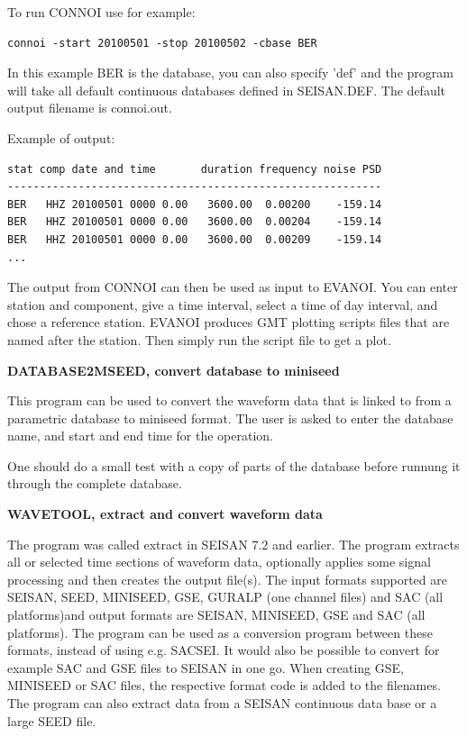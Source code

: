 To run CONNOI use for example:
\begin{verbatim}
connoi -start 20100501 -stop 20100502 -cbase BER
\end{verbatim}

In this example BER is the database, you can also specify 'def' and
the program will take all default continuous databases defined in SEISAN.DEF.
The default output filename is connoi.out. 

Example of output:

\begin{verbatim}
stat comp date and time       duration frequency noise PSD
----------------------------------------------------------
BER   HHZ 20100501 0000 0.00   3600.00  0.00200    -159.14
BER   HHZ 20100501 0000 0.00   3600.00  0.00204    -159.14
BER   HHZ 20100501 0000 0.00   3600.00  0.00209    -159.14
...
\end{verbatim}

The output from CONNOI can then be used as input to EVANOI. You can enter 
station and component, give a time interval, select a time of day interval,
and chose a reference station. EVANOI produces GMT plotting scripts files
that are named after the station. Then simply run the script file to 
get a plot.

\textbf{DATABASE2MSEED, convert database to miniseed}

This program can be used to convert the waveform data that is linked to
from a parametric database to miniseed format. The user is asked to enter the
database name, and start and end time for the operation.

One should do a small test with a copy of parts of the database before
runnung it through the complete database.

\textbf{WAVETOOL, extract and convert waveform data}

The program was called extract in SEISAN 7.2 and earlier. The program extracts all or selected time sections of waveform data, optionally applies some signal processing and then creates the output file(s). The input formats supported are SEISAN, SEED, MINISEED, GSE, GURALP (one channel files) and SAC (all platforms)and output formats are SEISAN, MINISEED, GSE and SAC (all platforms). The program can be used as a conversion program between these formats, instead of using e.g. SACSEI. It would also be possible to convert for example SAC and GSE files to SEISAN in one go. When creating GSE, MINISEED or SAC files, the respective format code is added to the filenames. The program can also extract data from a SEISAN continuous data base or a large SEED file. 

